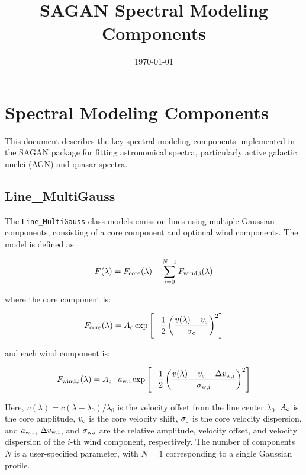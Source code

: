 \documentclass[11pt]{article}
\title{SAGAN Spectral Modeling Components}
\author{}
\date{\today}
\begin{document}
\maketitle

\section{Spectral Modeling Components}

This document describes the key spectral modeling components implemented in the SAGAN package for fitting astronomical spectra, particularly active galactic nuclei (AGN) and quasar spectra.

\subsection{Line\_MultiGauss}

The \texttt{Line\_MultiGauss} class models emission lines using multiple Gaussian components, consisting of a core component and optional wind components. The model is defined as:

\begin{equation}
F(\lambda) = F_{\rm core}(\lambda) + \sum_{i=0}^{N-1} F_{\rm wind,i}(\lambda)
\end{equation}

where the core component is:

\begin{equation}
F_{\rm core}(\lambda) = A_{\rm c} \exp\left[-\frac{1}{2}\left(\frac{v(\lambda) - v_{\rm c}}{\sigma_{\rm c}}\right)^2\right]
\end{equation}

and each wind component is:

\begin{equation}
F_{\rm wind,i}(\lambda) = A_{\rm c} \cdot a_{\rm w,i} \exp\left[-\frac{1}{2}\left(\frac{v(\lambda) - v_{\rm c} - \Delta v_{\rm w,i}}{\sigma_{\rm w,i}}\right)^2\right]
\end{equation}

Here, $v(\lambda) = c(\lambda - \lambda_0)/\lambda_0$ is the velocity offset from the line center $\lambda_0$, $A_{\rm c}$ is the core amplitude, $v_{\rm c}$ is the core velocity shift, $\sigma_{\rm c}$ is the core velocity dispersion, and $a_{\rm w,i}$, $\Delta v_{\rm w,i}$, and $\sigma_{\rm w,i}$ are the relative amplitude, velocity offset, and velocity dispersion of the $i$-th wind component, respectively. The number of components $N$ is a user-specified parameter, with $N=1$ corresponding to a single Gaussian profile.
\end{document}
